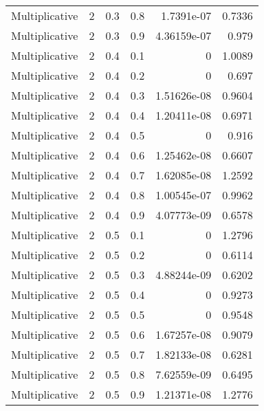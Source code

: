 \documentclass{article}
\begin{document}
\begin{longtable}[H]{lrrrrr}
 Multiplicative &       2 &   0.3 &            0.8 &      1.7391e-07  &          0.7336 \\
 Multiplicative &       2 &   0.3 &            0.9 &      4.36159e-07 &          0.979  \\
 Multiplicative &       2 &   0.4 &            0.1 &      0           &          1.0089 \\
 Multiplicative &       2 &   0.4 &            0.2 &      0           &          0.697  \\
 Multiplicative &       2 &   0.4 &            0.3 &      1.51626e-08 &          0.9604 \\
 Multiplicative &       2 &   0.4 &            0.4 &      1.20411e-08 &          0.6971 \\
 Multiplicative &       2 &   0.4 &            0.5 &      0           &          0.916  \\
 Multiplicative &       2 &   0.4 &            0.6 &      1.25462e-08 &          0.6607 \\
 Multiplicative &       2 &   0.4 &            0.7 &      1.62085e-08 &          1.2592 \\
 Multiplicative &       2 &   0.4 &            0.8 &      1.00545e-07 &          0.9962 \\
 Multiplicative &       2 &   0.4 &            0.9 &      4.07773e-09 &          0.6578 \\
 Multiplicative &       2 &   0.5 &            0.1 &      0           &          1.2796 \\
 Multiplicative &       2 &   0.5 &            0.2 &      0           &          0.6114 \\
 Multiplicative &       2 &   0.5 &            0.3 &      4.88244e-09 &          0.6202 \\
 Multiplicative &       2 &   0.5 &            0.4 &      0           &          0.9273 \\
 Multiplicative &       2 &   0.5 &            0.5 &      0           &          0.9548 \\
 Multiplicative &       2 &   0.5 &            0.6 &      1.67257e-08 &          0.9079 \\
 Multiplicative &       2 &   0.5 &            0.7 &      1.82133e-08 &          0.6281 \\
 Multiplicative &       2 &   0.5 &            0.8 &      7.62559e-09 &          0.6495 \\
 Multiplicative &       2 &   0.5 &            0.9 &      1.21371e-08 &          1.2776 \\

\end{longtable}
\end{document}
